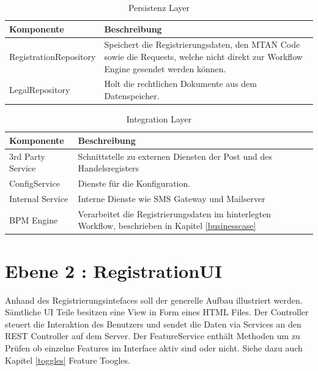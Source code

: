 \begin{table}[H]
	\centering
	\caption{Persistenz Layer}
	\begin{tabular}{ | p{4cm} | p{11cm} | }
		\toprule
		{\textbf{Komponente}} & {\textbf{Beschreibung}} \\
		\midrule
		RegistrationRepository &  Speichert die Registrierungsdaten, den MTAN Code sowie die Requests, welche nicht direkt zur Workflow Engine gesendet werden können. \\ \hline
		LegalRepository &  Holt die rechtlichen Dokumente aus dem Datenspeicher. \\
		\bottomrule
	\end{tabular}
\end{table}

\begin{table}[H]
	\centering
	\caption{Integration Layer}
	\begin{tabular}{ | p{4cm} | p{11cm} | }
		\toprule
		{\textbf{Komponente}} & {\textbf{Beschreibung}} \\
		\midrule
		3rd Party Service &  Schnittstelle zu externen Diensten der Post und des Handelsregisters\\ \hline
		ConfigService &  Dienste für die Konfiguration.\\ \hline
		Internal Service &  Interne Dienste wie SMS Gateway und Mailserver\\ \hline
		BPM Engine & Verarbeitet die Registrierungsdaten im hinterlegten Workflow, beschrieben in Kapitel \ref{businesscase}\\
		\bottomrule
	\end{tabular}
\end{table}
\newpage


\section{Ebene 2 : RegistrationUI}
Anhand des Registrierungsintefaces soll der generelle Aufbau illustriert werden. Sämtliche UI Teile besitzen eine View in Form eines HTML Files. Der Controller steuert die Interaktion des Benutzers und sendet die Daten via Services an den REST Controller auf dem Server. Der FeatureService enthält Methoden um zu Prüfen ob einzelne Features im Interface aktiv sind oder nicht. Siehe dazu auch Kapitel \ref{toggles} Feature Toogles.

